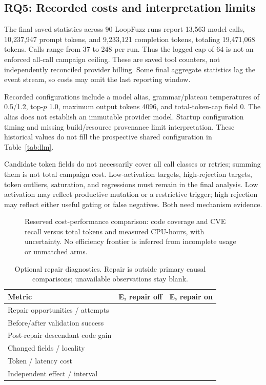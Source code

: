 \documentclass[final,5p,times,number]{elsarticle}
\newcommand{\missing}{\mbox{}}
\newcommand{\blankpanel}[1]{\fbox{\begin{minipage}[c][#1][c]{0.93\linewidth}\mbox{}\end{minipage}}}
\begin{document}
\subsection{RQ5: Recorded costs and interpretation limits}
The final saved statistics across 90 LoopFuzz runs report 13,563 model calls, 10,237,947 prompt tokens, and 9,233,121 completion tokens, totaling 19,471,068 tokens. Calls range from 37 to 248 per run. Thus the logged cap of 64 is not an enforced all-call campaign ceiling. These are saved tool counters, not independently reconciled provider billing. Some final aggregate statistics lag the event stream, so costs may omit the last reporting window.

Recorded configurations include a model alias, grammar/plateau temperatures of 0.5/1.2, top-$p$ 1.0, maximum output tokens 4096, and total-token-cap field 0. The alias does not establish an immutable provider model. Startup configuration timing and missing build/resource provenance limit interpretation. These historical values do not fill the prospective shared configuration in Table~\ref{tab:llm}.

Candidate token fields do not necessarily cover all call classes or retries; summing them is not total campaign cost. Low-activation targets, high-rejection targets, token outliers, saturation, and regressions must remain in the final analysis. Low activation may reflect productive mutation or a restrictive trigger; high rejection may reflect either useful gating or false negatives. Both need mechanism evidence.



\begin{figure}[t]
\centering\blankpanel{28mm}
\caption{Reserved cost-performance comparison: code coverage and CVE recall versus total tokens and measured CPU-hours, with uncertainty. No efficiency frontier is inferred from incomplete usage or unmatched arms.}
\label{fig:cost}
\end{figure}

\begin{table}[t]
\centering\small
\caption{Optional repair diagnostics. Repair is outside primary causal comparisons; unavailable observations stay blank.}
\label{tab:repair}
\begin{tabularx}{\columnwidth}{Y c c}
\toprule
Metric & E, repair off & E, repair on \\
\midrule
Repair opportunities / attempts & \missing & \missing \\
Before/after validation success & \missing & \missing \\
Post-repair descendant code gain & \missing & \missing \\
Changed fields / locality & \missing & \missing \\
Token / latency cost & \missing & \missing \\
Independent effect / interval & \missing & \missing \\
\bottomrule
\end{tabularx}
\end{table}
\end{document}
